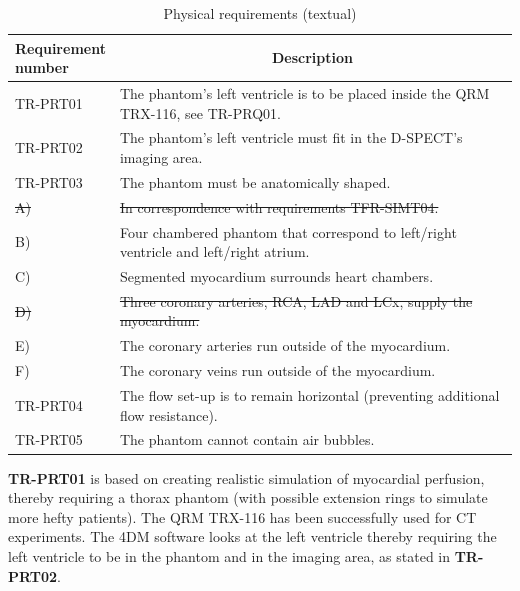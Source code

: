 \begin{table}[H]
\caption{Physical requirements (textual)}
\label{tab:physrec_text}
\begin{tabular}{l|p{115mm}|}
	\makecell[l]{\textbf{Requirement} \\  \textbf{number}} & \multicolumn{1}{c}{\textbf{Description}} \\
	\hline
	TR-PRT01 			& The phantom's left ventricle is to be placed inside the QRM TRX-116, see TR-PRQ01. \\
	TR-PRT02 			& The phantom's left ventricle must fit in the D-SPECT's imaging area. \\
	TR-PRT03 			& The phantom must be anatomically shaped. \\
	\hspace{1.5cm} \sout{A)} 	& \sout{In correspondence with requirements TFR-SIMT04.} \\
	\hspace{1.5cm} B) 	& Four chambered phantom that correspond to left/right ventricle and left/right atrium. \\
	\hspace{1.5cm} C) 	& Segmented myocardium surrounds heart chambers. \\
	\hspace{1.5cm}\sout{D)}	& \sout{Three coronary arteries, RCA, LAD and LCx, supply the myocardium.} \\
	\hspace{1.5cm} E) 	& The coronary arteries run outside of the myocardium. \\
	\hspace{1.5cm} F) 	& The coronary veins run outside of the myocardium. \\
	TR-PRT04 			& The flow set-up is to remain horizontal (preventing additional flow resistance). \\
	TR-PRT05 			& The phantom cannot contain air bubbles. \\
	\cline{2-2}
\end{tabular}
\end{table}

\textbf{TR-PRT01} is based on creating realistic simulation of myocardial perfusion, thereby requiring a thorax phantom (with possible extension rings to simulate more hefty patients). The QRM TRX-116 has been successfully used for CT experiments. The 4DM software looks at the left ventricle thereby requiring the left ventricle to be in the phantom and in the imaging area, as stated in \textbf{TR-PRT02}.

